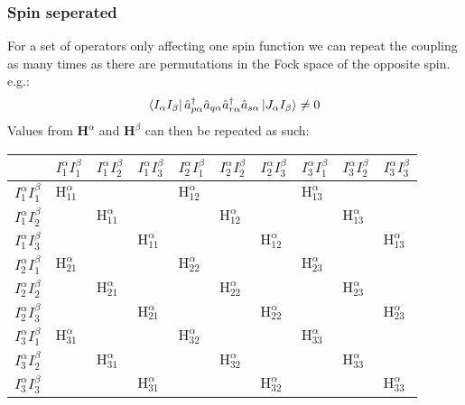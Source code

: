 \subsubsection{Spin seperated}
For a set of operators only affecting one spin function we can repeat the coupling as many times as there are permutations in the Fock space of the opposite spin. e.g.:
\begin{equation} \label{eq:coupling_alpha}
  \bra{I_\alpha I_\beta} \hat{a}^{\dagger}_{p \alpha} \hat{a}_{q \alpha} \hat{a}^{\dagger}_{r \alpha} \hat{a}_{s \alpha} \ket{J_\alpha I_\beta} \neq 0
\end{equation}
Values from  $\textbf{H}^\alpha$ and $\textbf{H}^\beta$ can then be repeated as such:
\begin{table}[H]
\begin{center}
\begin{tabular}{|l||l|l|l|l|l|l|l|l|l|}
\hline
 & $I_{1}^{\alpha} I_{1}^{\beta}$ & $I_{1}^{\alpha} I_{2}^{\beta}$  &  $I_{1}^{\alpha} I_{3}^{\beta}$ &  $I_{2}^{\alpha} I_{1}^{\beta}$ & $I_{2}^{\alpha} I_{2}^{\beta}$  &  $I_{2}^{\alpha} I_{3}^{\beta}$ &  $I_{3}^{\alpha} I_{1}^{\beta}$ &  $I_{3}^{\alpha} I_{2}^{\beta}$ & $I_{3}^{\alpha} I_{3}^{\beta}$ \\ \hline \hline
$I_{1}^{\alpha} I_{1}^{\beta}$ & $\text{H}^{\alpha}_{11}$ &  &  & $\text{H}^{\alpha}_{12}$ &  &  & $\text{H}^{\alpha}_{13}$ &  &  \\ \hline
$I_{1}^{\alpha} I_{2}^{\beta}$ &  & $\text{H}^{\alpha}_{11}$ &  &  & $\text{H}^{\alpha}_{12}$ &  &  & $\text{H}^{\alpha}_{13}$  &  \\ \hline
$I_{1}^{\alpha} I_{3}^{\beta}$ &  &  & $\text{H}^{\alpha}_{11}$ &  &  & $\text{H}^{\alpha}_{12}$ &  &  & $\text{H}^{\alpha}_{13}$ \\ \hline
$I_{2}^{\alpha} I_{1}^{\beta}$ & $\text{H}^{\alpha}_{21}$ &  &  & $\text{H}^{\alpha}_{22}$ &  &  & $\text{H}^{\alpha}_{23}$ &  &  \\ \hline
$I_{2}^{\alpha} I_{2}^{\beta}$ &  & $\text{H}^{\alpha}_{21}$ &  &  & $\text{H}^{\alpha}_{22}$ &  &  & $\text{H}^{\alpha}_{23}$ &  \\ \hline
$I_{2}^{\alpha} I_{3}^{\beta}$ &  &  &  $\text{H}^{\alpha}_{21}$&  &  & $\text{H}^{\alpha}_{22}$ &  &  & $\text{H}^{\alpha}_{23}$ \\ \hline
$I_{3}^{\alpha} I_{1}^{\beta}$ & $\text{H}^{\alpha}_{31}$ &  &  & $\text{H}^{\alpha}_{32}$ &  &  & $\text{H}^{\alpha}_{33}$ &  &  \\ \hline
$I_{3}^{\alpha} I_{2}^{\beta}$ &  & $\text{H}^{\alpha}_{31}$ &  &  & $\text{H}^{\alpha}_{32}$ &  &  & $\text{H}^{\alpha}_{33}$ &  \\ \hline
$I_{3}^{\alpha} I_{3}^{\beta}$ &  &  & $\text{H}^{\alpha}_{31}$ &  &  & $\text{H}^{\alpha}_{32}$ &  &  & $\text{H}^{\alpha}_{33}$ \\ \hline
\end{tabular}
\end{center}
\end{table}

